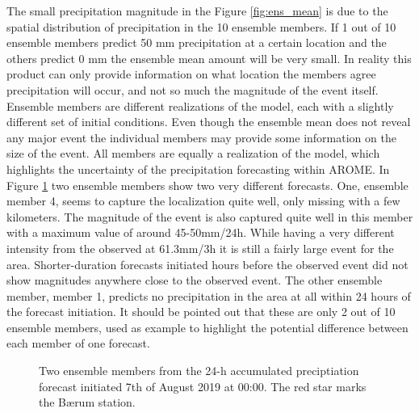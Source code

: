 The small precipitation magnitude in the Figure \ref{fig:ens_mean} is due to the spatial distribution of precipitation in the 10 ensemble members. If 1 out of 10 ensemble members predict 50 mm precipitation at a certain location and the others predict 0 mm the ensemble mean amount will be very small. In reality this product can only provide information on what location the members agree precipitation will occur, and not so much the magnitude of the event itself. Ensemble members are different realizations of the model, each with a slightly different set of initial conditions. Even though the ensemble mean does not reveal any major event the individual members may provide some information on the size of the event. All members are equally a realization of the model, which highlights the uncertainty of the precipitation forecasting within AROME. In Figure \ref{fig:ensmember} two ensemble members show two very different forecasts. One, ensemble member 4, seems to capture the localization quite well, only missing with a few kilometers. The magnitude of the event is also captured quite well in this member with a maximum value of around 45-50mm/24h. While having a very different intensity from the observed at 61.3mm/3h it is still a fairly large event for the area. Shorter-duration forecasts initiated hours before the observed event did not show magnitudes anywhere close to the observed event. The other ensemble member, member 1, predicts no precipitation in the area at all within 24 hours of the forecast initiation. It should be pointed out that these are only 2 out of 10 ensemble members, used as example to highlight the potential difference between each member of one forecast.   

\begin{figure}[hbt!]%
    \centering
    \qquad
    \caption{Two ensemble members from the 24-h accumulated preciptiation forecast initiated 7th of August 2019 at 00:00. The red star marks the Bærum station.}%
    \label{fig:ensmember}%
\end{figure}

